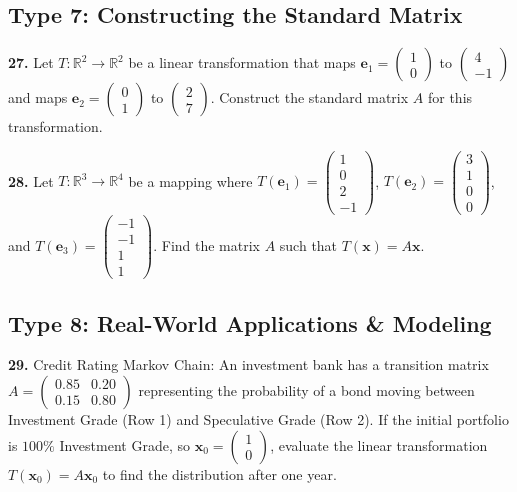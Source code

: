 \documentclass{article}
\begin{document}
\subsection*{Type 7: Constructing the Standard Matrix}
\textbf{27.} Let $T: \mathbb{R}^2 \to \mathbb{R}^2$ be a linear transformation that maps $\mathbf{e}_1 = \begin{pmatrix} 1 \\ 0 \end{pmatrix}$ to $\begin{pmatrix} 4 \\ -1 \end{pmatrix}$ and maps $\mathbf{e}_2 = \begin{pmatrix} 0 \\ 1 \end{pmatrix}$ to $\begin{pmatrix} 2 \\ 7 \end{pmatrix}$. Construct the standard matrix $A$ for this transformation.

\vspace{0.3cm}
\textbf{28.} Let $T: \mathbb{R}^3 \to \mathbb{R}^4$ be a mapping where $T(\mathbf{e}_1) = \begin{pmatrix} 1 \\ 0 \\ 2 \\ -1 \end{pmatrix}$, $T(\mathbf{e}_2) = \begin{pmatrix} 3 \\ 1 \\ 0 \\ 0 \end{pmatrix}$, and $T(\mathbf{e}_3) = \begin{pmatrix} -1 \\ -1 \\ 1 \\ 1 \end{pmatrix}$. Find the matrix $A$ such that $T(\mathbf{x}) = A\mathbf{x}$.

\subsection*{Type 8: Real-World Applications \& Modeling}
\textbf{29.} Credit Rating Markov Chain: An investment bank has a transition matrix $A = \begin{pmatrix} 0.85 & 0.20 \\ 0.15 & 0.80 \end{pmatrix}$ representing the probability of a bond moving between Investment Grade (Row 1) and Speculative Grade (Row 2). If the initial portfolio is $100\%$ Investment Grade, so $\mathbf{x}_0 = \begin{pmatrix} 1 \\ 0 \end{pmatrix}$, evaluate the linear transformation $T(\mathbf{x}_0) = A\mathbf{x}_0$ to find the distribution after one year.
\end{document}
